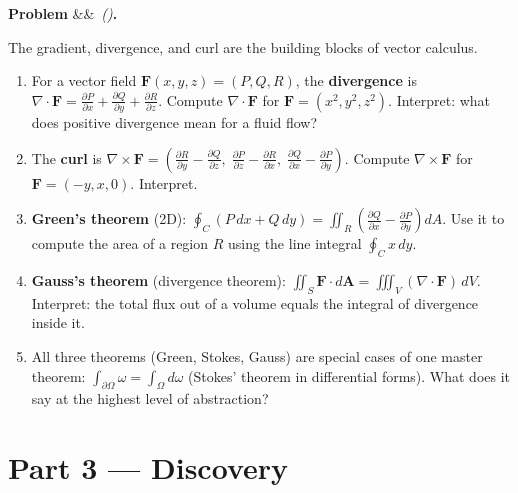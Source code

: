 \documentclass[12pt, a4paper]{article}
\newcounter{problem}
\newenvironment{problem}[1][]{%
  \refstepcounter{problem}%
  \par\vspace{6pt}%
  \noindent\textbf{\color{MidBlue}Problem \theproblem}%
  \ifx&#1&\else\ \textit{(#1)}\fi\textbf{.}\enskip
}{\par\vspace{4pt}}
\begin{document}
\begin{problem}
\label{prob:gradient_theorem}
The gradient, divergence, and curl are the building blocks of vector calculus.
\begin{enumerate}[label=(\alph*), topsep=2pt]
  \item For a vector field $\mathbf{F}(x,y,z) = (P, Q, R)$, the \textbf{divergence} is $\nabla \cdot \mathbf{F} = \frac{\partial P}{\partial x} + \frac{\partial Q}{\partial y} + \frac{\partial R}{\partial z}$. Compute $\nabla \cdot \mathbf{F}$ for $\mathbf{F} = (x^2, y^2, z^2)$. Interpret: what does positive divergence mean for a fluid flow?
  \item The \textbf{curl} is $\nabla \times \mathbf{F} = \left(\frac{\partial R}{\partial y} - \frac{\partial Q}{\partial z},\; \frac{\partial P}{\partial z} - \frac{\partial R}{\partial x},\; \frac{\partial Q}{\partial x} - \frac{\partial P}{\partial y}\right)$. Compute $\nabla\times\mathbf{F}$ for $\mathbf{F} = (-y, x, 0)$. Interpret.
  \item \textbf{Green's theorem} (2D): $\oint_C (P\,dx + Q\,dy) = \iint_R \left(\frac{\partial Q}{\partial x} - \frac{\partial P}{\partial y}\right)dA$. Use it to compute the area of a region $R$ using the line integral $\oint_C x\,dy$.
  \item \textbf{Gauss's theorem} (divergence theorem): $\iint_S \mathbf{F}\cdot d\mathbf{A} = \iiint_V (\nabla\cdot\mathbf{F})\,dV$. Interpret: the total flux out of a volume equals the integral of divergence inside it.
  \item All three theorems (Green, Stokes, Gauss) are special cases of one master theorem: $\int_{\partial\Omega} \omega = \int_\Omega d\omega$ (Stokes' theorem in differential forms). What does it say at the highest level of abstraction?
\end{enumerate}
\end{problem}

\section{Part 3 \texorpdfstring{---}{--} Discovery}
\end{document}
